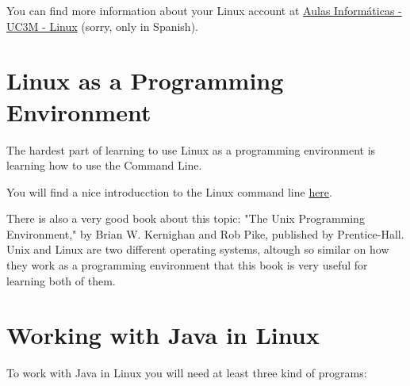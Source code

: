 \documentclass[a4paper, 12pt]{article}
\begin{document}
You can find more information about your Linux account at
\href{http://www.aig.uc3m.es/index.php?option=com_content&task=view&id=28&Itemid=49}{Aulas
Informáticas - UC3M - Linux} (sorry, only in Spanish).

\section{Linux as a Programming Environment}

The hardest part of learning to use Linux as a programming environment is
learning how to use the Command Line.

You will find a nice introducction to the Linux command line
\href{http://linuxcommand.org/lc3_learning_the_shell.php#contents}{here}.

There is also a very good book about this topic: "The Unix Programming
Environment," by Brian W. Kernighan and Rob Pike, published by Prentice-Hall.
Unix and Linux are two different operating systems, altough so similar on how
they work as a programming environment that this book is very useful for
learning both of them.


\section{Working with Java in Linux}

To work with Java in Linux you will need at least three kind of programs:
\end{document}
